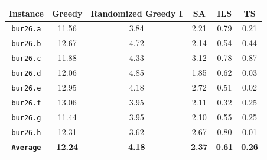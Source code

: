 \documentclass[a4paper,10pt]{article}
\begin{document}
\vspace{5mm}
\begin{center}
\begin{tabular}{||c c c c c c ||} 
 \hline
 \textbf{Instance} & \textbf{Greedy} & \textbf{Randomized Greedy I} & \textbf{SA} & \textbf{ILS} & \textbf{TS} \\ [0.5ex] 
 \hline\hline
 \texttt{bur26.a} & 11.56 & 3.84 & 2.21 & 0.79 & 0.21\\ 
 \hline
 \texttt{bur26.b} & 12.67 & 4.72 & 2.14 & 0.54 & 0.44\\ 
 \hline
 \texttt{bur26.c} & 11.88 & 4.33 & 3.12 & 0.78 & 0.87\\ 
 \hline
 \texttt{bur26.d} & 12.06 & 4.85 & 1.85 & 0.62 & 0.03\\ 
 \hline
 \texttt{bur26.e} & 12.95 & 4.18 & 2.72 & 0.51 & 0.02\\ 
 \hline
 \texttt{bur26.f} & 13.06 & 3.95 & 2.11 & 0.32 & 0.25\\ 
 \hline
 \texttt{bur26.g} & 11.44 & 3.95 & 2.10 & 0.55 & 0.25\\ 
 \hline
 \texttt{bur26.h} & 12.31 & 3.62 & 2.67 & 0.80 & 0.01\\ 
 \hline
 \texttt{\textbf{Average}} & \textbf{12.24} & \textbf{4.18} & \textbf{2.37} & \textbf{0.61} & \textbf{0.26}\\ 
 \hline
\end{tabular}
\end{center}

\newpage
\end{document}
